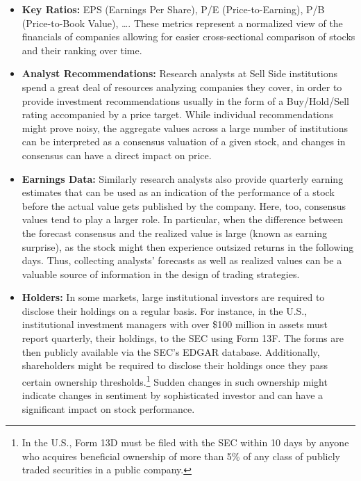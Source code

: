 \begin{itemize}
\item \textbf{Key Ratios:} EPS (Earnings Per Share), P/E (Price-to-Earning), P/B (Price-to-Book Value), \dots. These metrics represent a normalized view of the financials of companies allowing for easier cross-sectional comparison of stocks and their ranking over time.


\item \textbf{Analyst Recommendations:} Research analysts at Sell Side institutions spend a great deal of resources analyzing companies they cover, in order to provide investment recommendations usually in the form of a Buy/Hold/Sell rating accompanied by a price target. While individual recommendations might prove noisy, the aggregate values across a large number of institutions can be interpreted as a consensus valuation of a given stock, and changes in consensus can have a direct impact on price.


\item \textbf{Earnings Data:} Similarly research analysts also provide quarterly earning estimates that can be used as an indication of the performance of a stock before the actual value gets published by the company. Here, too, consensus values tend to play a larger role. In particular, when the difference between the forecast consensus and the realized value is large (known as earning surprise), as the stock might then experience outsized returns in the following days. Thus, collecting analysts' forecasts as well as realized values can be a valuable source of information in the design of trading strategies.


\item \textbf{Holders:} In some markets, large institutional investors are required to disclose their holdings on a regular basis. For instance, in the U.S., institutional investment managers with over \$100 million in assets must report quarterly, their holdings, to the SEC using Form 13F. The forms are then publicly available via the SEC's EDGAR database. Additionally, shareholders might be required to disclose their holdings once they pass certain ownership thresholds.\footnote{In the U.S., Form 13D must be filed with the SEC within 10 days by anyone who acquires beneficial ownership of more than 5\% of any class of publicly traded securities in a public company.} Sudden changes in such ownership might indicate changes in sentiment by sophisticated investor and can have a significant impact on stock performance.



\end{itemize}
